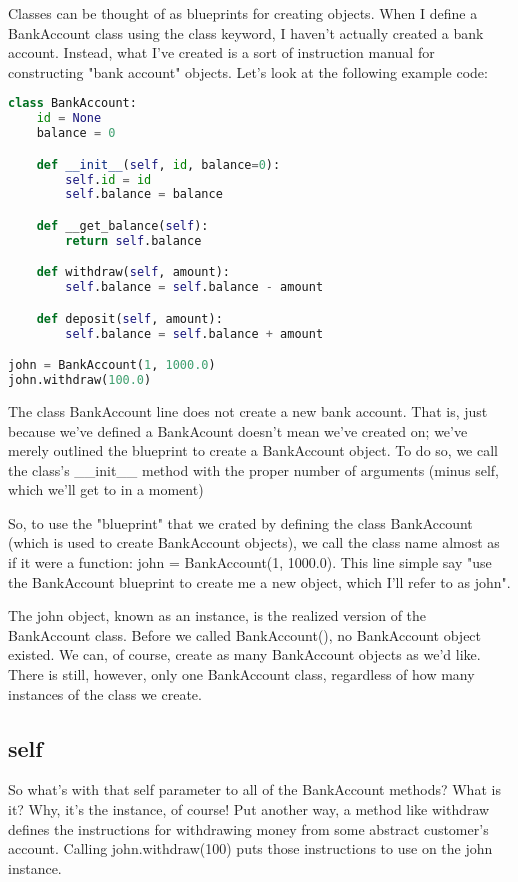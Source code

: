Classes can be thought of as blueprints for creating objects. When I define a BankAccount class using the class keyword, I haven't actually created a bank account. Instead, what I've created is a sort of instruction manual for constructing "bank account" objects. Let's look at the following example code:

\begin{lstlisting}[language=Python]
class BankAccount:
    id = None
    balance = 0

    def __init__(self, id, balance=0):
        self.id = id
        self.balance = balance

    def __get_balance(self):
        return self.balance

    def withdraw(self, amount):
        self.balance = self.balance - amount

    def deposit(self, amount):
        self.balance = self.balance + amount

john = BankAccount(1, 1000.0)
john.withdraw(100.0)
\end{lstlisting}

The class BankAccount line does not create a new bank account. That is, just because we've defined a BankAcount doesn't mean we've created on; we've merely outlined the blueprint to create a BankAccount object. To do so, we call the class's __init__ method with the proper number of arguments (minus self, which we'll get to in a moment)

So, to use the "blueprint" that we crated by defining the class BankAccount (which is used to create BankAccount objects), we call the class name almost as if it were a function: john = BankAccount(1, 1000.0). This line simple say "use the BankAccount blueprint to create me a new object, which I'll refer to as john".

The john object, known as an instance, is the realized version of the BankAccount class. Before we called BankAccount(), no BankAccount object existed. We can, of course, create as many BankAccount objects as we'd like. There is still, however, only one BankAccount class, regardless of how many instances of the class we create.

\subsection{self}

So what's with that self parameter to all of the BankAccount methods? What is it? Why, it's the instance, of course! Put another way, a method like withdraw defines the instructions for withdrawing money from some abstract customer's account. Calling john.withdraw(100) puts those instructions to use on the john instance.

